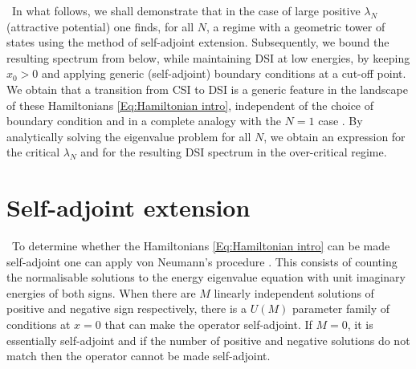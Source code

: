 \documentclass[aps,prl,reprint,preprintnumbers]{revtex4-1}
\begin{document}
{\ In what follows, we shall demonstrate that in the case of large positive $\lambda_{N}$ (attractive potential) one finds, for all $N$, a regime with a geometric tower of states using the method of self-adjoint extension. Subsequently, we bound the resulting spectrum from below, while maintaining DSI at low energies, by keeping $x_{0} > 0$ and applying generic (self-adjoint) boundary conditions at a cut-off point. We obtain that a transition from CSI to DSI is a generic feature in the landscape of these Hamiltonians \eqref{Eq:Hamiltonian intro}, independent of the choice of boundary condition and in a complete analogy with the $N=1$ case \cite{Case1950,deAlfaro1976,landau1991quantum,Camblong:2000ec,PhysRevD.68.025006,Hammer:2005sa,Braaten2004,Kaplan:2009kr}. By analytically solving the eigenvalue problem for all $N$, we obtain an expression for the critical $\lambda_{N}$ and for the resulting DSI spectrum in the over-critical regime.}

\section{Self-adjoint extension}

{\ To determine whether the Hamiltonians \eqref{Eq:Hamiltonian intro} can be made self-adjoint one can apply von Neumann's procedure \cite{Meetz1964,Bonneau:1999zq,Gitman:2009era,gitman2012self,2015AnHP...16.2367I}. This consists of counting the normalisable solutions to the energy eigenvalue equation with unit imaginary energies of both signs. When there are $M$ linearly independent solutions of positive and negative sign respectively, there is a $U(M)$ parameter family of conditions at $x = 0$ that can make the operator self-adjoint. If $M=0$, it is essentially self-adjoint and if the number of positive and negative solutions do not match then the operator cannot be made self-adjoint.}
\end{document}

